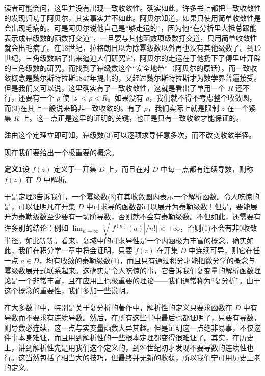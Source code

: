 读者可能会问，这里并没有出现一致收敛性。确实如此，许多书上都把一致收敛性的发现归功于阿贝尔，其实事实并不如此。阿贝尔知道，如果只使用简单收敛性是会出现毛病的。可是阿贝尔说他自己是“够走运的”，因为他“在分析里大抵总跟能表示成幂级数的函数打交道”，一旦要与其他函数项级数打交道，只用简单收敛性就会出毛病了。在18世纪，拉格朗日以为除幂级数以外再也没有其他级数了。到19世纪，三角级数站了出来逼迫人们研究它，阿贝尔的走运在于他扔下了傅里叶开辟的三角级数的研究，而找到了幂级数这个“安全地带”（阿贝尔的原话）。而一致收敛概念是魏尔斯特拉斯1847年提出的，又经过魏尔斯特拉斯才为数学界普遍接受。但是我们又可以说，这里确实有了一致收敛性，这就是看出了单用一个 $R$ 还不行，还要有一个 $\rho$ 使 $|z|<\rho<R$。如果没有 $\rho$，我们就不得不考虑整个收敛圆，而(3)在其上一般说来确非一致收敛的。有了 $\rho$，我们实际上就是限制 $z$ 在一个紧集 $K$ 上。这一点正是这里的证明的关键，也正是只有一致收敛才能保证的。

\noindent\textbf{注}\quad 由这个定理立即可知，幂级数(3)可以逐项求导任意多次，而不改变收敛半径。

现在我们要给出一个极重要的概念。

\noindent\textbf{定义1}\quad 设 $f(z)$ 定义于一开集 $D$ 上，而且在对 $D$ 中每一点都有连续导数，则称 $f(z)$ 在 $D$ 中解析。

于是定理3告诉我们，一个幂级数(3)在其收敛圆内表示一个解析函数。令人吃惊的是，可以证明凡在开集 $D$ 中可求导的函数都可以展开为泰勒级数！但是，要能展开为泰勒级数至少要有一切阶导数，否则就不会有泰勒级数。不但如此，还需要有许多别的结论：例如 $\lim_{n\to\infty}\sqrt[n]{|f^{(n)}(a)|/n!|}<+\infty$，否则(1)不会有非0收敛半径。如此等等。看来，复域中的可求导性是一个内涵极为丰富的概念。确实如此，我们在积分学一章中将会证明，只要 $f(z)$ 在开集 $D$ 中连续可导，则它在任一点 $a\in D$，均有收敛的泰勒级数(1)，而且只有通过积分才能把微分学的概念与幂级数展开式联系起来。这确实是令人吃惊的事，它告诉我们复变量的解析函数理论是一个非常丰富，且在应用上也极重要的理论——我们通常称为“复分析”。由于这个概念的重要性，我们多加一些说明。

在大多数书中，特别是关于复分析的著作中，解析性的定义只要求函数在 $D$ 中有导数而不要求有连续导数。然后，在所有这些书中最后也都证明了，只要有导数，则导数必连续，这一点与实变量函数大异其趣。但是证明这一点绝非易事，不仅这件事本身难证，而且用到解析性的一些根本定理都变得很难证了。其实，在历史上，讲到解析性先是用我们这个定义的，到20世纪初才发现不要导数的连续性也行。这当然包括了相当大的技巧，但最终并无新的收获，所以我们宁可用历史上老的定义。

